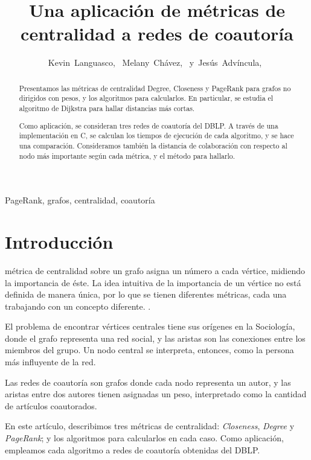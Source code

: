 \documentclass[journal]{IEEEtran}
\begin{document}
\title{Una aplicación de métricas de centralidad a redes de coautoría}
\author{Kevin~Languasco,~
        Melany~Chávez,~
        y~Jesús~Advíncula,~%
}

\maketitle
\begin{abstract}
Presentamos las métricas de centralidad Degree, Closeness y PageRank para grafos no dirigidos con pesos, y los algoritmos para calcularlos. En particular, se estudia el algoritmo de Dijkstra para hallar distancias más cortas.

Como aplicación, se consideran tres redes de coautoría del DBLP\@. A través de una implementación en C, se calculan los tiempos de ejecución de cada algoritmo, y se hace una comparación. Consideramos también la distancia de colaboración con respecto al nodo más importante según cada métrica, y el método para hallarlo.
\end{abstract}
\begin{IEEEkeywords}
PageRank, grafos, centralidad, coautoría
\end{IEEEkeywords}
\IEEEpeerreviewmaketitle

\section{Introducción}
 métrica de centralidad sobre un grafo asigna un número a cada vértice, midiendo la importancia de éste. La idea intuitiva de la importancia de un vértice no está definida de manera única, por lo que se tienen diferentes métricas, cada una trabajando con un concepto diferente. \cite{brandes}.

El problema de encontrar vértices centrales tiene sus orígenes en la Sociología, donde el grafo representa una red social, y las aristas son las conexiones entre los miembros del grupo. Un nodo central se interpreta, entonces, como la persona más influyente de la red.

Las redes de coautoría son grafos donde cada nodo representa un autor, y las aristas entre dos autores tienen asignadas un peso, interpretado como la cantidad de artículos coautorados.

En este artículo, describimos tres métricas de centralidad: \textit{Closeness}, \textit{Degree} y \textit{PageRank}; y los algoritmos para calcularlos en cada caso. Como aplicación, empleamos cada algoritmo a redes de coautoría obtenidas del DBLP.
\end{document}
